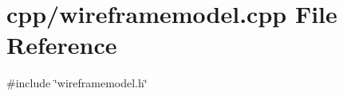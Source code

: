 \section{cpp/wireframemodel.cpp File Reference}
\label{wireframemodel_8cpp}
{\ttfamily \#include \char`\"{}wireframemodel.\+h\char`\"{}}\newline
